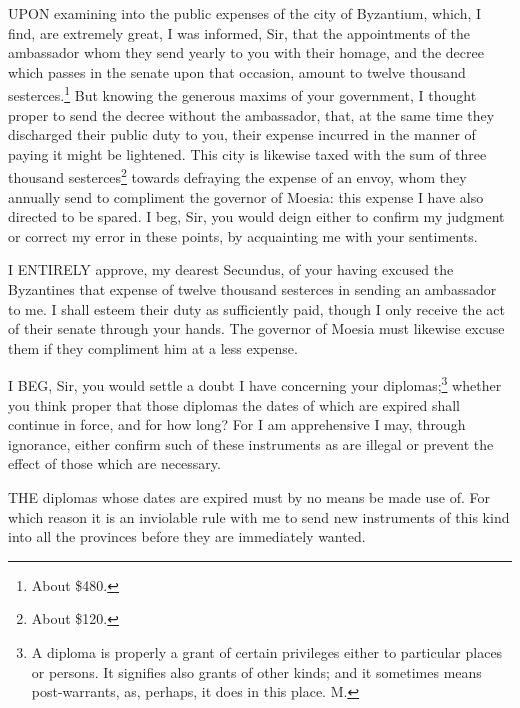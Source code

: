 
UPON examining into the public expenses of the city of Byzantium, which, I
find, are extremely great, I was informed, Sir, that the appointments of
the ambassador whom they send yearly to you with their homage, and the
decree which passes in the senate upon that occasion, amount to twelve
thousand sesterces.\footnote{About \$480.} But knowing the generous maxims of your
government, I thought proper to send the decree without the ambassador,
that, at the same time they discharged their public duty to you, their
expense incurred in the manner of paying it might be lightened. This city
is likewise taxed with the sum of three thousand sesterces\footnote{About \$120.}
towards defraying the expense of an envoy, whom they annually send to
compliment the governor of Moesia: this expense I have also directed to be
spared. I beg, Sir, you would deign either to confirm my judgment or
correct my error in these points, by acquainting me with your sentiments.


I ENTIRELY approve, my dearest Secundus, of your having excused the
Byzantines that expense of twelve thousand sesterces in sending an
ambassador to me. I shall esteem their duty as sufficiently paid, though I
only receive the act of their senate through your hands. The governor of
Moesia must likewise excuse them if they compliment him at a less expense.


I BEG, Sir, you would settle a doubt I have concerning your diplomas;\footnote{A diploma is properly
a grant of certain privileges either to particular places or persons. It
signifies also grants of other kinds; and it sometimes means
post-warrants, as, perhaps, it does in this place. M.}
whether you think proper that those diplomas the dates of which are
expired shall continue in force, and for how long? For I am apprehensive I
may, through ignorance, either confirm such of these instruments as are
illegal or prevent the effect of those which are necessary.


THE diplomas whose dates are expired must by no means be made use of. For
which reason it is an inviolable rule with me to send new instruments of
this kind into all the provinces before they are immediately wanted.


